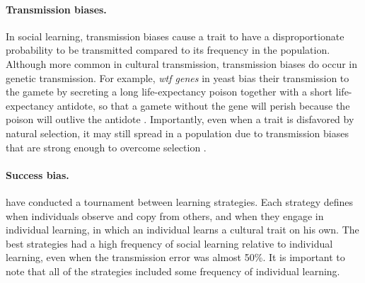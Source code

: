 \documentclass[12pt]{extarticle}
\begin{document}
\paragraph{Transmission biases.}
In social learning, transmission biases cause a trait to have a disproportionate probability to be transmitted compared to its frequency in the population.
Although more common in cultural transmission, transmission biases do occur in genetic transmission. For example, \textit{wtf genes} in yeast bias their transmission to the gamete by secreting a long life-expectancy poison together with a short life-expectancy antidote, so that a gamete without the gene will perish because the poison will outlive the antidote \citep{wtfGene}.
Importantly, even when a trait is disfavored by natural selection, it may still spread in a population due to transmission biases that are strong enough to overcome selection \citep[Ch. 8 pg. 279]{evolutionBook}.

\paragraph{Success bias.}
\citet{strategiesPaper} have conducted a tournament between learning strategies. Each strategy defines when individuals observe and copy from others, and when they engage in individual learning, in which an individual learns a cultural trait on his own. The best strategies had a high frequency of social learning relative to individual learning, even when the transmission error was almost 50\%. It is important to note that all of the strategies included some frequency of individual learning. 

\end{document}
